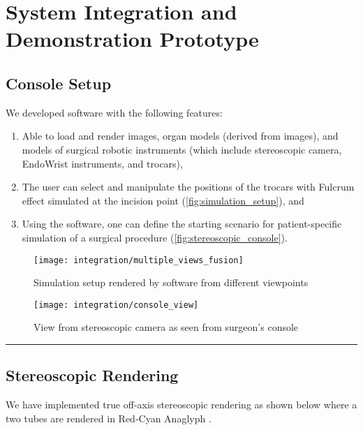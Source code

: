 
\section{System Integration and Demonstration Prototype}
\label{sec:system_integration}

\subsection{Console Setup}
\label{ssec:console_setup}
We developed software with the following features:
\begin{enumerate}
  \item Able to load and render  images, organ models (derived from  images), and  models of surgical robotic instruments (which include stereoscopic camera, EndoWrist instruments, and trocars),
  \item The user can select and manipulate the positions of the trocars with Fulcrum effect simulated at the incision point (\autoref{fig:simulation_setup}), and
  \item Using the software, one can define the starting scenario for patient-specific simulation of a surgical procedure (\autoref{fig:stereoscopic_console}).
\end{enumerate}

\begin{figure}
  \centering%
  \texttt{[image: integration/multiple\_views\_fusion]}
  \caption{Simulation setup rendered by software from different viewpoints}
  \label{fig:simulation_setup}
\end{figure}

\begin{figure}
  \centering%
  \texttt{[image: integration/console\_view]}
  \caption{View from stereoscopic camera as seen from surgeon’s console}
  \label{fig:stereoscopic_console}
\end{figure}

\hrule%

\subsection{Stereoscopic Rendering}
\label{ssec:stereo_rendering}

We have implemented true off-axis stereoscopic rendering as shown below where a two tubes are rendered in Red-Cyan Anaglyph .

